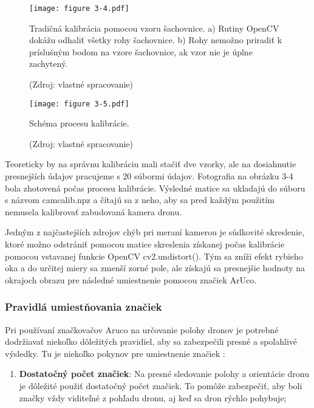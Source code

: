 {\begin{figure}[ht!]
    \centering
    \texttt{[image: figure 3-4.pdf]}
    \caption{Tradičná kalibrácia pomocou vzoru šachovnice. a) Rutiny OpenCV dokážu odhaliť všetky rohy šachovnice. b) Rohy nemožno priradiť k príslušným bodom na vzore šachovnice, ak vzor nie je úplne zachytený.}
    \captionsetup{font=footnotesize, justification=centering, skip=5pt}
    \caption*{(Zdroj: vlastné spracovanie)}
    \label{o:3-4}
\end{figure}  

\begin{figure}[ht!]
    \centering
    \texttt{[image: figure 3-5.pdf]}
    \caption{Schéma procesu kalibrácie.}
    \captionsetup{font=footnotesize, justification=centering, skip=5pt}
    \caption*{(Zdroj: vlastné spracovanie)}
    \label{o:3-5}
\end{figure}  

Teoreticky by na správnu kalibráciu mali stačiť dve vzorky, ale na dosiahnutie presnejších údajov pracujeme s 20 súbormi údajov. Fotografia na obrázku 3-4 bola zhotovená počas procesu kalibrácie. Výsledné matice sa ukladajú do súboru s názvom camcalib.npz a čítajú sa z neho, aby sa pred každým použitím nemusela kalibrovať zabudovaná kamera dronu. 

Jedným z najčastejších zdrojov chýb pri meraní kamerou je súdkovité skreslenie, ktoré možno odstrániť pomocou matice skreslenia získanej počas kalibrácie pomocou vstavanej funkcie OpenCV cv2.undistort(). Tým sa zníži efekt rybieho oka a do určitej miery sa zmenší zorné pole, ale získajú sa presnejšie hodnoty na okrajoch obrazu pre následné umiestnenie pomocou značiek ArUco.
\subsubsection{Pravidlá umiestňovania značiek}
Pri používaní značkovačov Aruco na určovanie polohy dronov je potrebné dodržiavať niekoľko dôležitých pravidiel, aby sa zabezpečili presné a spoľahlivé výsledky. Tu je niekoľko pokynov pre umiestnenie značiek \citep{Marut2019}:
\begin{enumerate}

\item \textbf{Dostatočný počet značiek}: Na presné sledovanie polohy a orientácie dronu je dôležité použiť dostatočný počet značiek. To pomôže zabezpečiť, aby boli značky vždy viditeľné z pohľadu dronu, aj keď sa dron rýchlo pohybuje;


\end{enumerate}}
